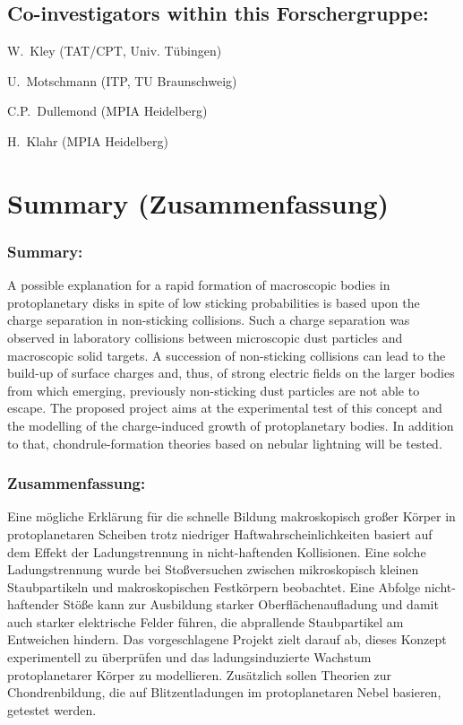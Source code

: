 \subsection{Co-investigators within this Forschergruppe:}
\begin{coilist}
\item W.~Kley (TAT/CPT, Univ. T\"ubingen)
\item U.~Motschmann (ITP, TU Braunschweig)
\item C.P.~Dullemond (MPIA Heidelberg)
\item H.~Klahr (MPIA Heidelberg)
\end{coilist}


\section{Summary (Zusammenfassung)}
\subsubsection{Summary:}
A possible explanation for a rapid formation of macroscopic bodies
in protoplanetary disks in spite of low sticking probabilities is
based upon the charge separation in non-sticking collisions. Such
a charge separation was observed in laboratory collisions between
microscopic dust particles and macroscopic solid targets. A
succession of non-sticking collisions can lead to the build-up of
surface charges and, thus, of strong electric fields on the larger
bodies from which emerging, previously non-sticking dust particles
are not able to escape. The proposed project aims at the
experimental test of this concept and the modelling of the
charge-induced growth of protoplanetary bodies. In addition to
that, chondrule-formation theories based on nebular lightning will
be tested.

\subsubsection{Zusammenfassung:}
Eine m\"ogliche Erkl\"arung f\"ur die schnelle Bildung
makroskopisch gro{\ss}er K\"orper in protoplanetaren Scheiben
trotz niedriger Haftwahrscheinlichkeiten basiert auf dem Effekt
der Ladungstrennung in nicht-haftenden Kollisionen. Eine solche
Ladungstrennung wurde bei Sto{\ss}versuchen zwischen mikroskopisch
kleinen Staubpartikeln und makroskopischen Fest\-k\"or\-pern
beobachtet. Eine Abfolge nicht-haftender St\"o{\ss}e kann zur
Ausbildung starker Oberfl\"a\-chen\-auf\-ladung und damit auch
starker elektrische Felder f\"uhren, die abprallende Staubpartikel
am Entweichen hindern. Das vorgeschlagene Projekt zielt darauf ab,
dieses Konzept experimentell zu \"uberpr\"ufen und das
ladungsinduzierte Wachstum protoplanetarer K\"orper zu
modellieren. Zus\"atzlich sollen Theorien zur Chondrenbildung, die
auf Blitzentladungen im protopla\-ne\-taren Nebel basieren,
getestet werden.


